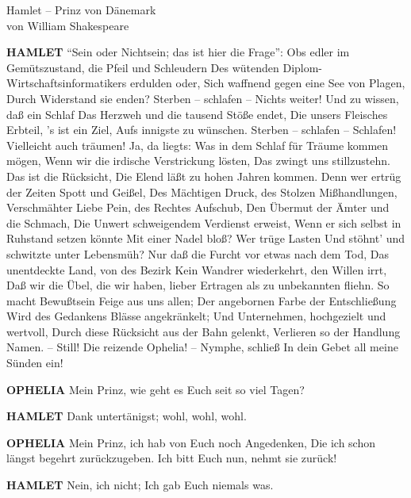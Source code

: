 \documentclass[11pt,a4paper]{scrreprt}
\begin{document}
\begin{center}
\Large
Hamlet -- Prinz von Dänemark\\
\tiny
von William Shakespeare
\end{center}

\textbf{HAMLET}
"`Sein oder Nichtsein; das ist hier die Frage"':
Obs edler im Gemütszustand, die Pfeil und Schleudern
Des wütenden Di\-plom-Wirt\-schafts\-in\-for\-ma\-tik\-ers erdulden oder,
Sich waffnend gegen eine See von Plagen,
Durch Widerstand sie enden? Sterben -- schlafen --
Nichts weiter! Und zu wissen, daß ein Schlaf
Das Herzweh und die tausend Stöße endet,
Die unsers Fleisches Erbteil, 's ist ein Ziel,
Aufs innigste zu wünschen. Sterben -- schlafen --
Schlafen! Vielleicht auch träumen! Ja, da liegts:
Was in dem Schlaf für Träume kommen mögen,
Wenn wir die irdische Verstrickung lösten,
Das zwingt uns stillzustehn. Das ist die Rücksicht,
Die Elend läßt zu hohen Jahren kommen.
Denn wer ertrüg der Zeiten Spott und Geißel,
Des Mächtigen Druck, des Stolzen Mißhandlungen,
Verschmähter Liebe Pein, des Rechtes Aufschub,
Den Übermut der Ämter und die Schmach,
Die Unwert schweigendem Verdienst erweist,
Wenn er sich selbst in Ruhstand setzen könnte
Mit einer Nadel bloß? Wer trüge Lasten
Und stöhnt' und schwitzte unter Lebensmüh?
Nur daß die Furcht vor etwas nach dem Tod,
Das unentdeckte Land, von des Bezirk
Kein Wandrer wiederkehrt, den Willen irrt,
Daß wir die Übel, die wir haben, lieber
Ertragen als zu unbekannten fliehn.
So macht Bewußtsein Feige aus uns allen;
Der angebornen Farbe der Entschließung
Wird des Gedankens Blässe angekränkelt;
Und Unternehmen, hochgezielt und wertvoll,
Durch diese Rücksicht aus der Bahn gelenkt,
Verlieren so der Handlung Namen. -- Still!
Die reizende Ophelia! -- Nymphe, schließ
In dein Gebet all meine Sünden ein!

\textbf{OPHELIA}
Mein Prinz, wie geht es Euch seit so viel Tagen?

\textbf{HAMLET}
Dank untertänigst; wohl, wohl, wohl.

\textbf{OPHELIA}
Mein Prinz, ich hab von Euch noch Angedenken,
Die ich schon längst begehrt zurückzugeben.
Ich bitt Euch nun, nehmt sie zurück!

\textbf{HAMLET}
Nein, ich nicht;
Ich gab Euch niemals was.
\end{document}
